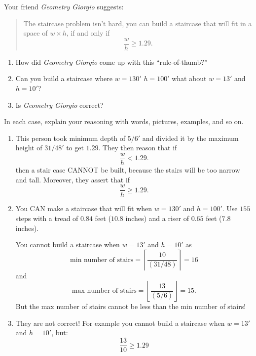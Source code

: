 \documentclass[noauthor,nooutcomes,handout,12pt]{ximera}
\begin{document}
\begin{question}
  Your friend \textit{Geometry Giorgio} suggests:
  \begin{quote}
    The staircase problem isn't hard, you can build a staircase that
    will fit in a space of $w\times h$, if and only if
    \[
    \frac{w}{h} \ge 1.29.
    \]
  \end{quote}
  \begin{enumerate}
    \item How did \textit{Geometry Giorgio} come up with this ``rule-of-thumb?''
    \item Can you build a staircase where  $w=130'$ $h=100'$ what about $w=13'$ and $h=10'$?
    \item Is \textit{Geometry Giorgio} correct?
       
  \end{enumerate}
  In each case, explain your reasoning with words, pictures, examples, and so on.
  \begin{freeResponse}
    \begin{enumerate}
    \item This person took minimum depth of $5/6'$ and divided it by
      the maximum height of $31/48'$ to get $1.29$. They then reason that if
      \[
      \frac{w}{h} <1.29.
      \]
      then a stair case CANNOT be built, because the stairs will be
      too narrow and tall. Moreover, they assert that if
      \[
      \frac{w}{h} \ge 1.29.
      \]
    \item You CAN make a staircase that will fit when $w=130'$ and
      $h=100'$. Use $155$ steps with a tread of $0.84$ feet ($10.8$
      inches) and a riser of $0.65$ feet ($7.8$ inches).


      You cannot build a staircase when $w=13'$ and $h=10'$ as
      \[
      \text{min number of stairs} = \left\lceil
      \frac{10}{\left(31/48\right)} \right\rceil=16
      \]
      and
      \[
      \text{max number of stairs} = \left\lfloor
      \frac{13}{\left(5/6\right)} \right\rfloor=15.
      \]
      But the max number of stairs cannot be less than the min number
      of stairs!

    \item They are not correct! For example you cannot build a
      staircase when $w=13'$ and $h=10'$, but:
      \[
      \frac{13}{10}\ge 1.29
      \]
    \end{enumerate}
  \end{freeResponse}
\end{question}
\end{document}
